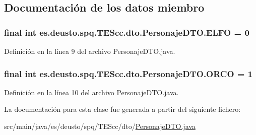 \subsection{Documentación de los datos miembro}
\hypertarget{classes_1_1deusto_1_1spq_1_1_t_e_scc_1_1dto_1_1_personaje_d_t_o_a4fae9f6ba64b6976e251df09c56d58eb}{
\subsubsection[{E\+L\+F\+O}]{\setlength{\rightskip}{0pt plus 5cm}final int es.\+deusto.\+spq.\+T\+E\+Scc.\+dto.\+Personaje\+D\+T\+O.\+E\+L\+F\+O = 0\hspace{0.3cm}{\ttfamily [static]}}}\label{classes_1_1deusto_1_1spq_1_1_t_e_scc_1_1dto_1_1_personaje_d_t_o_a4fae9f6ba64b6976e251df09c56d58eb}


Definición en la línea 9 del archivo Personaje\+D\+T\+O.\+java.

\hypertarget{classes_1_1deusto_1_1spq_1_1_t_e_scc_1_1dto_1_1_personaje_d_t_o_af6b6d74e020103d4cd1b9434ec24454b}{
\subsubsection[{O\+R\+C\+O}]{\setlength{\rightskip}{0pt plus 5cm}final int es.\+deusto.\+spq.\+T\+E\+Scc.\+dto.\+Personaje\+D\+T\+O.\+O\+R\+C\+O = 1\hspace{0.3cm}{\ttfamily [static]}}}\label{classes_1_1deusto_1_1spq_1_1_t_e_scc_1_1dto_1_1_personaje_d_t_o_af6b6d74e020103d4cd1b9434ec24454b}


Definición en la línea 10 del archivo Personaje\+D\+T\+O.\+java.



La documentación para esta clase fue generada a partir del siguiente fichero\+:\begin{DoxyCompactItemize}
\item 
src/main/java/es/deusto/spq/\+T\+E\+Scc/dto/\hyperlink{_personaje_d_t_o_8java}{Personaje\+D\+T\+O.\+java}\end{DoxyCompactItemize}
